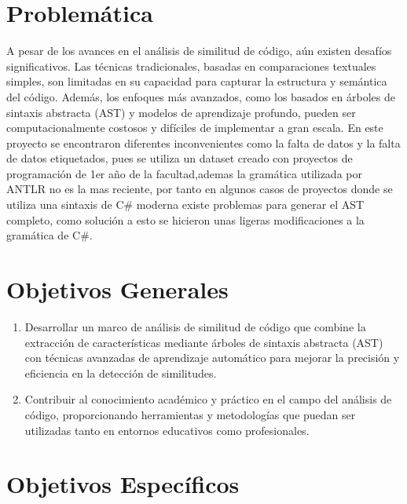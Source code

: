 \section*{Problemática}
A pesar de los avances en el análisis de similitud de código, aún existen desafíos significativos. Las técnicas tradicionales, basadas en comparaciones textuales simples, son limitadas en su capacidad para capturar la estructura y semántica del código. Además, los enfoques más avanzados, como los basados en árboles de sintaxis abstracta (AST) y modelos de aprendizaje profundo, pueden ser computacionalmente costosos y difíciles de implementar a gran escala. En este proyecto se encontraron diferentes inconvenientes como la falta de datos y la falta de datos etiquetados, pues se utiliza un dataset creado con proyectos de programación de 1er año de la facultad,ademas la gramática utilizada por ANTLR no es la mas reciente, por tanto en algunos casos de proyectos donde se utiliza una sintaxis de C\# moderna existe problemas para generar el AST completo, como solución a esto se hicieron unas ligeras modificaciones a la gramática de C\#.

\section*{Objetivos Generales} 

\renewcommand{\labelenumi}{\Roman{enumi}.}
\begin{enumerate}
	\item Desarrollar un marco de análisis de similitud de código que combine la extracción de características mediante árboles de sintaxis abstracta (AST) con técnicas avanzadas de aprendizaje automático para mejorar la precisión y eficiencia en la detección de similitudes.
	\item Contribuir al conocimiento académico y práctico en el campo del análisis de código, proporcionando herramientas y metodologías que puedan ser utilizadas tanto en entornos educativos como profesionales.
\end{enumerate}
 
\section*{Objetivos Específicos}

